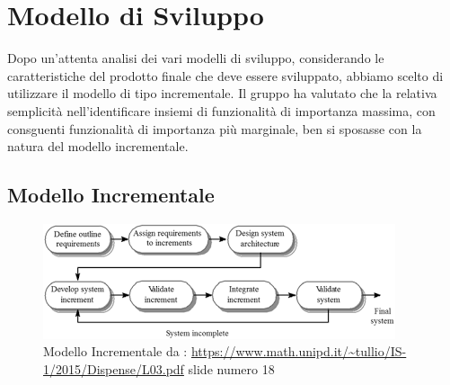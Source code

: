 \section{Modello di Sviluppo}
\label{ModelloSviluppo}

Dopo un'attenta analisi dei vari modelli di sviluppo, considerando le caratteristiche del prodotto finale che deve essere sviluppato, abbiamo  scelto di utilizzare il modello di tipo incrementale. Il gruppo ha valutato che la relativa semplicità nell'identificare insiemi di funzionalità di importanza massima, con consguenti funzionalità di importanza più marginale, ben si sposasse con la natura del modello incrementale.

\subsection{Modello Incrementale}

\begin{figure}[h]
	\centering
  		\includegraphics[width=0.7\linewidth]{./images/modelloincrementale.png}
  		\caption{Modello Incrementale da : \url{https://www.math.unipd.it/~tullio/IS-1/2015/Dispense/L03.pdf} slide numero 18}
  		\label{fig:Modello Incrementale}
\end{figure}

